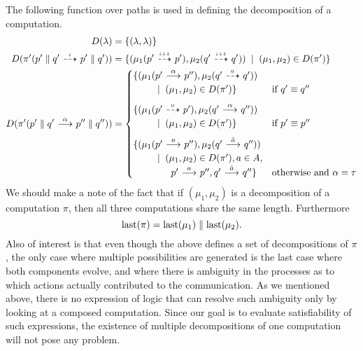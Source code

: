 The following function over paths is used in defining the decomposition of a computation.
\begin{align*}
    D(\lambda) &= \{(\lambda,\lambda)\} \\
    D(\pi'(p'\parallel q' \ {\stackrel{_{i}}{\dashrightarrow}}\  p'\parallel q')) &=
        \{(\mu_1(p'\ {\stackrel{_{i+1}}{\dashrightarrow}}\ p'),\mu_2(q'\ {\stackrel{_{i+1}}{\dashrightarrow}}\ q')) \;\;|\;\; (\mu_1,\mu_2)\in D(\pi')\} \\
    D(\pi'(p'\parallel q' \ {\stackrel{{\alpha}}{\longrightarrow}}\  p''\parallel q'')) &=
        \begin{cases}
            \{(\mu_1(p' \ {\stackrel{{\alpha}}{\longrightarrow}}\  p''), \mu_2(q' \ {\stackrel{_{0}}{\dashrightarrow}}\  q')) \\ \quad\quad
                \;\;|\;\; (\mu_1,\mu_2) \in D(\pi')\} & \textrm{if $q'\equiv q''$} \\[0.7em]
            \{(\mu_1(p' \ {\stackrel{_{0}}{\dashrightarrow}}\  p'), \mu_2(q'\ {\stackrel{{\alpha}}{\longrightarrow}}\  q'')) \\ \quad\quad
                \;\;|\;\; (\mu_1,\mu_2) \in D(\pi')\} & \textrm{if $p'\equiv p''$} \\[0.7em]
            \{(\mu_1(p'\ {\stackrel{{a}}{\longrightarrow}}\ p''), \mu_2(q'\ {\stackrel{{\bar{a}}}{\longrightarrow}}\ q'')) \\ \quad\quad
                \;\;|\;\; (\mu_1,\mu_2) \in D(\pi'), a\in A, \\
                \qquad\qquad p'\ {\stackrel{{a}}{\longrightarrow}}\ p'', q'\ {\stackrel{{\bar{a}}}{\longrightarrow}}\ q''\}
                & \textrm{otherwise and $\alpha=\tau$}
        \end{cases}
\end{align*}
We should make a note of the fact that if $(\mu_1,\mu_2)$ is a decomposition
of a computation $\pi$, then all three computations share the same length.
Furthermore
\[
    \operatorname{last}(\pi) = \operatorname{last}(\mu_1) \parallel \operatorname{last}(\mu_2).
\]
%
Also of interest
is that even though the above defines a set of decompositions of $\pi$, the only
case where multiple possibilities are generated is the last case where both components
evolve, and where there is ambiguity in the processes as to which actions actually
contributed to the communication. As we mentioned above, there is no expression
of \HMLpast{} logic that can resolve such ambiguity only by looking at a composed
computation.
Since our goal is to evaluate satisfiability of such expressions, the
existence of multiple decompositions of one computation will not pose any problem.

